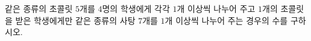 같은 종류의 초콜릿 $5$개를 $4$명의 학생에게 각각 $1$개 이상씩 나누어 주고 $1$개의 초콜릿을 받은 학생에게만 같은 종류의 사탕 $7$개를 $1$개 이상씩 나누어 주는 경우의 수를 구하시오.
